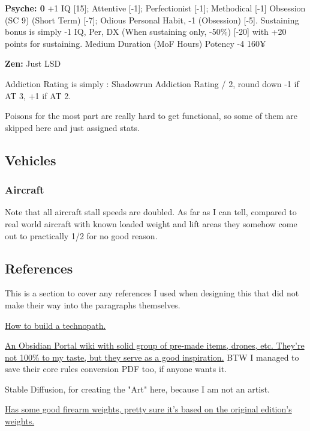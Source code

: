 \begin{multicols*}{2}
	\textbf{Psyche: 0}
	+1 IQ [15]; Attentive [-1]; Perfectionist [-1]; Methodical [-1] Obsession (SC 9) (Short Term) [-7]; Odious Personal Habit, -1 (Obsession) [-5]. Sustaining bonus is simply -1 IQ, Per, DX (When sustaining only, -50\%) [-20] with +20 points for sustaining.
	Medium Duration (MoF Hours)
	Potency	-4
	160¥
	
	\textbf{Zen: }
	Just LSD
	
	Addiction Rating is simply : Shadowrun Addiction Rating  / 2, round down -1 if AT 3, +1 if AT 2.
	
	
	Poisons for the most part are really hard to get functional, so some of them are skipped here and just assigned stats.
	
	\subsection{Vehicles}
	
	\subsubsection{Aircraft}
	
	Note that all aircraft stall speeds are doubled. As far as I can tell, compared to real world aircraft with known loaded weight and lift areas they somehow come out to practically 1/2 for no good reason.
	
	\subsection{References}
	
	This is a section to cover any references I used when designing this that did not make their way into the paragraphs themselves.
	
	\href{https://www.ravensnpennies.com/gurps101-how-to-build-a-technopath/}{How to build a technopath.}
	
	\href{https://gurps-sr.obsidianportal.com}{An Obsidian Portal wiki with solid group of pre-made items, drones, etc. They're not 100\% to my taste, but they serve as a good inspiration.} BTW I managed to save their core rules conversion PDF too, if anyone wants it.
	
	Stable Diffusion, for creating the "Art" here, because I am not an artist.
	
	\href{http://www.ci-n.com/~jcampbel/rpgs/shadowrun/weapons.php?altskills}{Has some good firearm weights, pretty sure it's based on the original edition's weights.}
	

\end{multicols*}
